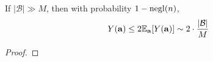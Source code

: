 \begin{lemma}\label{lemma:yabound}
If $|\mathcal{B}|\gg M$, then with probability $1-\operatorname{negl}(n)$, 
\begin{equation}
\label{eq:1}
Y(\mathbf{a})\leq 2\mathbb{E}_{\mathbf{a}}[Y(\mathbf{a})]\sim 2\cdot \frac{|\mathcal{B}|}{M}
\end{equation}
\end{lemma}

\begin{proof}


\end{proof}
